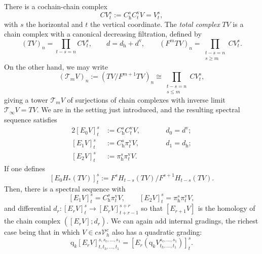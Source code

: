 \documentclass[11pt]{amsart} \renewcommand{\baselinestretch}{1.4}
\theoremstyle{plain}
\theoremstyle{definition}
\renewcommand{\to}{\longrightarrow}
\newcommand{\calT}{\mathcal{T}}
\newcommand{\calV}{\mathcal{V}}
\newcommand{\vect}[2]{\calV^{#1}_{#2}}
\newcommand{\quadgrad}[1]{\mathrm{q}_{#1}}
\newcommand{\Edownup}[5]{[E_{#1}^{#2}#3]^{#4}_{#5}}
\newcommand{\uver}{^\mathrm{v}}
\newcommand{\dhor}{_\mathrm{h}}
\begin{document}
\begin{Conventions and notation}
There is a cochain-chain complex 
\[CV^{s}_{t}:=C\dhor^{s}C\uver_{t}V=V^{s}_{t},\]
with $s$ the horizontal and $t$ the vertical coordinate. The \emph{total complex} $TV$ is a chain complex with a canonical decreasing filtration, defined by 
\[\textstyle(TV)_n=\prod_{t-s=n}CV^{s}_{t},\qquad d=d\dhor+d\uver,\qquad(F^mTV)_n=\prod_{\substack{t-s=n\\s\geq m}}CV^{s}_{t}.\]
On the other hand, we may write
\[(\calT_mV)_n:=(TV/F^{m+1} TV)_n\cong\textstyle\prod_{\substack{t-s=n\\s\leq m}}CV^{s}_{t}, \]
giving a tower $\calT_mV$ of surjections of chain complexes with inverse limit $\calT_\infty V=TV$. We are in the setting just introduced, and the resulting spectral sequence satisfies
\begin{alignat*}{2}
\Edownup{0}{}{V}{s}{t}
&:=
C\dhor^sC\uver_tV,
&\qquad&d_0=d\uver;\\
\Edownup{1}{}{V}{s}{t}
&:=
C\dhor^s\pi\uver_tV,
&\qquad&d_1=d\dhor;\\
\Edownup{2}{}{V}{s}{t}
&:=
\pi\dhor^s\pi\uver_tV.
\end{alignat*}
If one defines
\[\Edownup{0}{}{H_*( TV)}{s}{t}:=F^{s}H_{t-s}( TV)/F^{s+1}   H_{t-s}( TV).\]
Then, there is a spectral sequence with
\[\Edownup{1}{}{V}{s}{t}=C\dhor^{s}\pi\uver_{t}V,\qquad\Edownup{2}{}{V}{s}{t}=\pi\dhor^{s}\pi\uver_{t}V,\]
and differential $d_r:\Edownup{r}{}{V}{s}{t}\to \Edownup{r}{}{V}{s+r}{t+r-1}$ so that $\Edownup{r+1}{}{V}{}{}$ is the homology of the chain complex $(\Edownup{r}{}{V}{}{};d_r)$. 
We can again add internal gradings, the richest case being that in which  $V\in cs\vect{c}{h}$ also has a quadratic grading:
\[\quadgrad{k}\Edownup{r}{}{V}{s,s_c,\ldots,s_1}{t,t_h,\ldots,t_1}=\Edownup{r}{}{(\quadgrad{k}V^{s_c,\ldots,s_1}_{t_h,\ldots,t_1})}{s}{t}.\]


\end{Conventions and notation}
\end{document}
